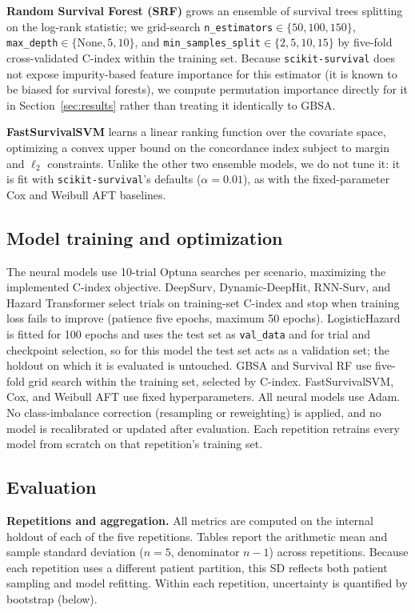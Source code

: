 \textbf{Random Survival Forest (SRF)} \citep{pickett2021random_survival_forests,ishwaran2008random} grows an ensemble of survival trees splitting on the log-rank statistic; we grid-search \texttt{n\_estimators}$\in\{50,100,150\}$, \texttt{max\_depth}$\in\{\text{None},5,10\}$, and \texttt{min\_samples\_split}$\in\{2,5,10,15\}$ by five-fold cross-validated C-index within the training set. Because \texttt{scikit-survival} does not expose impurity-based feature importance for this estimator (it is known to be biased for survival forests), we compute permutation importance directly for it in Section~\ref{sec:results} rather than treating it identically to GBSA.

\textbf{FastSurvivalSVM} learns a linear ranking function over the covariate space, optimizing a convex upper bound on the concordance index subject to margin and $\ell_2$ constraints. Unlike the other two ensemble models, we do not tune it: it is fit with \texttt{scikit-survival}'s defaults ($\alpha=0.01$), as with the fixed-parameter Cox and Weibull AFT baselines.

\subsection{Model training and optimization} \label{sec:training}
The neural models use 10-trial Optuna searches per scenario, maximizing the implemented C-index objective. DeepSurv, Dynamic-DeepHit, RNN-Surv, and Hazard Transformer select trials on training-set C-index and stop when training loss fails to improve (patience five epochs, maximum 50 epochs). LogisticHazard is fitted for 100 epochs and uses the test set as \texttt{val\_data} and for trial and checkpoint selection, so for this model the test set acts as a validation set; the holdout on which it is evaluated is untouched. GBSA and Survival RF use five-fold grid search within the training set, selected by C-index. FastSurvivalSVM, Cox, and Weibull AFT use fixed hyperparameters. All neural models use Adam. No class-imbalance correction (resampling or reweighting) is applied, and no model is recalibrated or updated after evaluation. Each repetition retrains every model from scratch on that repetition's training set.

\subsection{Evaluation} \label{sec:eval}
\textbf{Repetitions and aggregation.} All metrics are computed on the internal holdout of each of the five repetitions. Tables report the arithmetic mean and sample standard deviation ($n=5$, denominator $n-1$) across repetitions. Because each repetition uses a different patient partition, this SD reflects both patient sampling and model refitting. Within each repetition, uncertainty is quantified by bootstrap (below).

